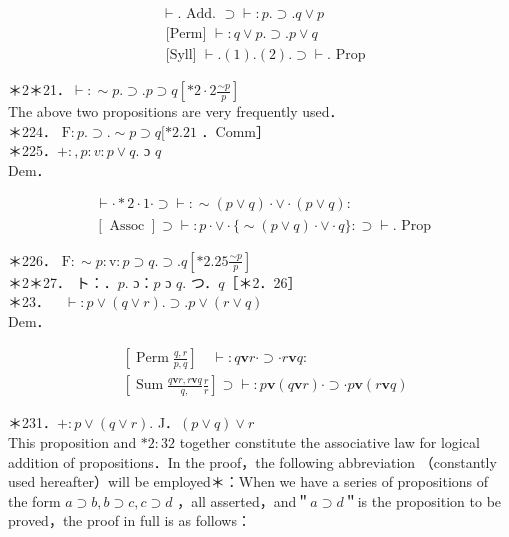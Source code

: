 \documentclass[10pt]{article}
\begin{document}
\begin{align*}
& \vdash . \text { Add. } \supset \vdash: p . \supset . q \vee p  \tag{1}\\
& \text { [Perm] } \vdash: q \vee p . \supset . p \vee q  \tag{2}\\
& \text { [Syll] } \vdash .(1) .(2) . \supset \vdash . \text { Prop }
\end{align*}


＊2＊21．$\vdash: \sim p . \supset . p \supset q\left[* 2 \cdot 2 \frac{\sim p}{p}\right]$\\
The above two propositions are very frequently used．\\
＊224． $\mathrm{F}: p . \supset . \sim p \supset q[* 2.21$ ．Comm］\\
＊225．$+:, p: v: p \vee q$. ɔ $q$\\
Dem．

$$
\begin{aligned}
& \vdash \cdot * 2 \cdot 1 \cdot \supset \vdash: \sim(p \vee q) \cdot \vee \cdot(p \vee q): \\
& {[\text { Assoc }] \supset \vdash: p \cdot \vee \cdot\{\sim(p \vee q) \cdot \vee \cdot q\}: \supset \vdash . \text { Prop }}
\end{aligned}
$$

＊226． $\mathrm{F}: \sim p: \mathrm{v}: p \supset q . \supset . q\left[* 2.25 \frac{\sim p}{p}\right]$\\
＊2＊27． ト：．$p$. ɔ：$p$ ɔ $q$. つ．$q$［＊2．26］\\
＊23．$\quad \vdash: p \vee(q \vee r) . \supset . p \vee(r \vee q)$\\
Dem．

$$
\begin{aligned}
& {\left[\operatorname{Perm} \frac{q, r}{p, q}\right] \quad \vdash: q \mathbf{v} r \cdot \supset \cdot r \mathbf{v} q:} \\
& {\left[\operatorname{Sum} \frac{q \mathbf{v} r, r \mathbf{v} q}{q,} \frac{r}{r}\right] \supset \vdash: p \mathbf{v}(q \mathbf{v} r) \cdot \supset \cdot p \mathbf{v}(r \mathbf{v} q)}
\end{aligned}
$$

＊231．$+: p \vee(q \vee r)$. J．$(p \vee q) \vee r$\\
This proposition and $* 2: 32$ together constitute the associative law for logical addition of propositions．In the proof，the following abbreviation （constantly used hereafter）will be employed＊：When we have a series of propositions of the form $a \supset b, b \supset c, c \supset d$ ，all asserted，and＂$a \supset d$＂is the proposition to be proved，the proof in full is as follows：
\end{document}
